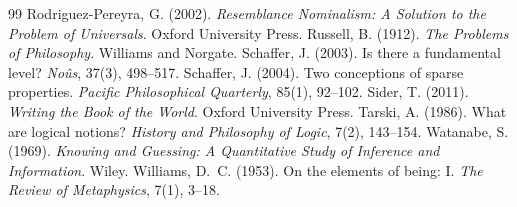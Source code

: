 \documentclass{situationist-preprint}
\begin{document}
\begin{thebibliography}{99}
 Rodriguez-Pereyra, G. (2002). \emph{Resemblance Nominalism: A Solution to the Problem of Universals}. Oxford University Press.
 Russell, B. (1912). \emph{The Problems of Philosophy}. Williams and Norgate.
 Schaffer, J. (2003). Is there a fundamental level? \emph{No\^us}, 37(3), 498--517.
 Schaffer, J. (2004). Two conceptions of sparse properties. \emph{Pacific Philosophical Quarterly}, 85(1), 92--102.
 Sider, T. (2011). \emph{Writing the Book of the World}. Oxford University Press.
 Tarski, A. (1986). What are logical notions? \emph{History and Philosophy of Logic}, 7(2), 143--154.
 Watanabe, S. (1969). \emph{Knowing and Guessing: A Quantitative Study of Inference and Information}. Wiley.
 Williams, D.~C. (1953). On the elements of being: I. \emph{The Review of Metaphysics}, 7(1), 3--18.
\end{thebibliography}
\end{document}

